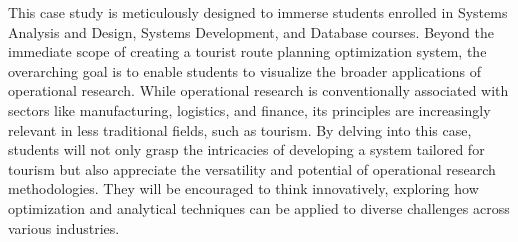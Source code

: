 This case study is meticulously designed to immerse students enrolled in Systems Analysis and Design, Systems Development, and Database courses. Beyond the immediate scope of creating a tourist route planning optimization system, the overarching goal is to enable students to visualize the broader applications of operational research. While operational research is conventionally associated with sectors like manufacturing, logistics, and finance, its principles are increasingly relevant in less traditional fields, such as tourism. By delving into this case, students will not only grasp the intricacies of developing a system tailored for tourism but also appreciate the versatility and potential of operational research methodologies. They will be encouraged to think innovatively, exploring how optimization and analytical techniques can be applied to diverse challenges across various industries.


